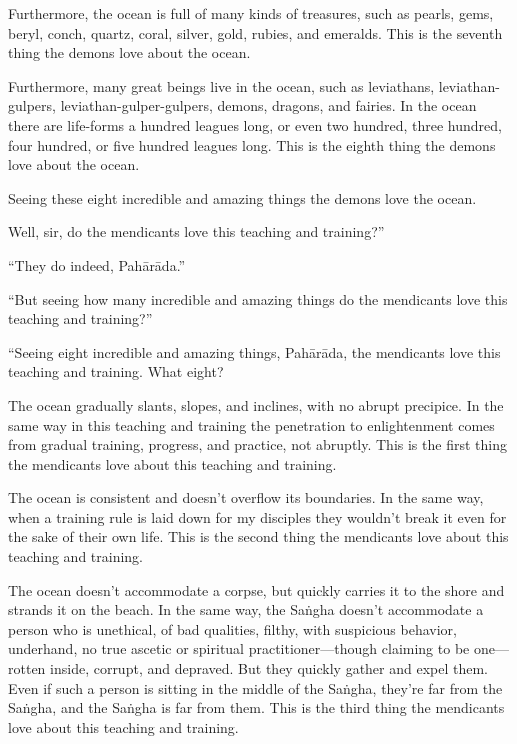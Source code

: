 \documentclass[12pt,openany]{book}%
\begin{document}
Furthermore, the ocean is full of many kinds of treasures, such as pearls, gems, beryl, conch, quartz, coral, silver, gold, rubies, and emeralds. This is the seventh thing the demons love about the ocean. 

Furthermore, many great beings live in the ocean, such as leviathans, leviathan-gulpers, leviathan-gulper-gulpers, demons, dragons, and fairies. In the ocean there are life-forms a hundred leagues long, or even two hundred, three hundred, four hundred, or five hundred leagues long. This is the eighth thing the demons love about the ocean. 

Seeing these eight incredible and amazing things the demons love the ocean. 

Well, sir, do the mendicants love this teaching and training?” 

“They do indeed, \textsanskrit{Pahārāda}.” 

“But seeing how many incredible and amazing things do the mendicants love this teaching and training?” 

“Seeing eight incredible and amazing things, \textsanskrit{Pahārāda}, the mendicants love this teaching and training. What eight? 

The ocean gradually slants, slopes, and inclines, with no abrupt precipice. In the same way in this teaching and training the penetration to enlightenment comes from gradual training, progress, and practice, not abruptly. This is the first thing the mendicants love about this teaching and training. 

The ocean is consistent and doesn’t overflow its boundaries. In the same way, when a training rule is laid down for my disciples they wouldn’t break it even for the sake of their own life. This is the second thing the mendicants love about this teaching and training. 

The ocean doesn’t accommodate a corpse, but quickly carries it to the shore and strands it on the beach. In the same way, the \textsanskrit{Saṅgha} doesn’t accommodate a person who is unethical, of bad qualities, filthy, with suspicious behavior, underhand, no true ascetic or spiritual practitioner—though claiming to be one—rotten inside, corrupt, and depraved. But they quickly gather and expel them. Even if such a person is sitting in the middle of the \textsanskrit{Saṅgha}, they’re far from the \textsanskrit{Saṅgha}, and the \textsanskrit{Saṅgha} is far from them. This is the third thing the mendicants love about this teaching and training. 
\end{document}
